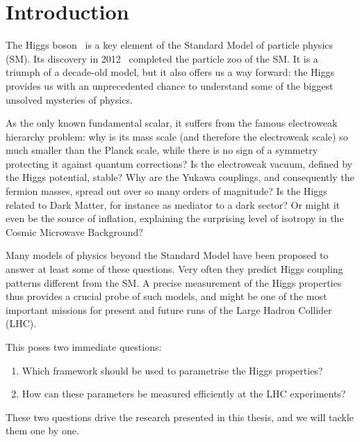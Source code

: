 
 
\chapter{Introduction}
\label{chapter:Introduction}

The Higgs boson~\cite{Higgs:1964ia, Higgs:1964pj, Englert:1964et} is a
key element of the Standard Model of particle physics (SM). Its
discovery in 2012~\cite{Aad:2012tfa, Chatrchyan:2012xdj} completed the
particle zoo of the SM. It is a triumph of a decade-old model, but it
also offers us a way forward: the Higgs provides us with an
unprecedented chance to understand some of the biggest unsolved
mysteries of physics.

As the only known fundamental scalar, it suffers from the famous
electroweak hierarchy problem: why is its mass scale (and therefore
the electroweak scale) so much smaller than the Planck scale, while
there is no sign of a symmetry protecting it against quantum
corrections? Is the electroweak vacuum, defined by the Higgs
potential, stable?  Why are the Yukawa couplings, and consequently the
fermion masses, spread out over so many orders of magnitude?  Is the
Higgs related to Dark Matter, for instance as mediator to a dark
sector? Or might it even be the source of inflation, explaining the
surprising level of isotropy in the Cosmic Microwave Background?

Many models of physics beyond the Standard Model have been proposed to
answer at least some of these questions. Very often they predict Higgs
coupling patterns different from the SM. A precise measurement of the
Higgs properties thus provides a crucial probe of such models, and
might be one of the most important missions for present and future
runs of the Large Hadron Collider (LHC).

This poses two immediate questions:
%
\begin{enumerate}
\item Which framework should be used to parametrise the Higgs
  properties?
\item How can these parameters be measured efficiently at the LHC
  experiments?
\end{enumerate}
%
These two questions drive the research presented in this thesis, and
we will tackle them one by one.

